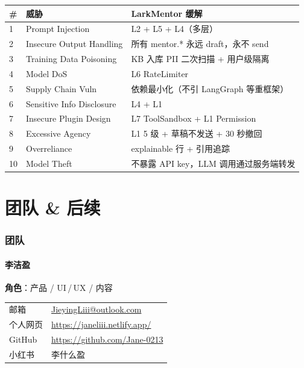 \documentclass[11pt,a4paper]{ctexart}
\begin{document}
\begin{tabular}{p{0.6cm}p{4cm}p{9cm}}
\toprule
\textbf{\#} & \textbf{威胁} & \textbf{LarkMentor 缓解} \\
\midrule
1 & Prompt Injection & L2 + L5 + L4（多层）\\
2 & Insecure Output Handling & 所有 mentor.* 永远 draft，永不 send \\
3 & Training Data Poisoning & KB 入库 PII 二次扫描 + 用户级隔离 \\
4 & Model DoS & L6 RateLimiter \\
5 & Supply Chain Vuln & 依赖最小化（不引 LangGraph 等重框架）\\
6 & Sensitive Info Disclosure & L4 + L1 \\
7 & Insecure Plugin Design & L7 ToolSandbox + L1 Permission \\
8 & Excessive Agency & L1 5 级 + 草稿不发送 + 30 秒撤回 \\
9 & Overreliance & explainable 行 + 引用追踪 \\
10 & Model Theft & 不暴露 API key，LLM 调用通过服务端转发 \\
\bottomrule
\end{tabular}

\newpage
\part{团队 \& 后续}

\section{团队}

\subsection{李洁盈}
\textbf{角色}：产品 / UI\,/\,UX / 内容

\begin{tabular}{p{2.5cm}p{12cm}}
\toprule
邮箱 & \href{mailto:JieyingLiii@outlook.com}{JieyingLiii@outlook.com} \\
个人网页 & \url{https://janeliii.netlify.app/} \\
GitHub & \url{https://github.com/Jane-0213} \\
小红书 & 李什么盈 \\
\bottomrule
\end{tabular}
\end{document}
